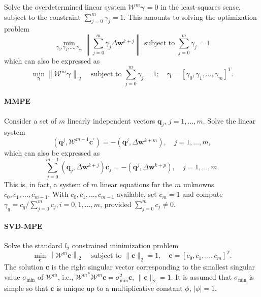 Solve the overdetermined linear system \(\mathscr W^{m} \boldsymbol\gamma=0\) in the least-squares sense, subject to the constraint \(\sum_{j=0}^{m} \gamma_{j}=1\).
This amounts to solving the optimization problem
\begin{equation}
\min _{\gamma_{0}, \gamma_{1}, \ldots, \gamma_{m}}\left\|\sum_{j=0}^{m} \gamma_{j} \Delta\mathbf w^{k+j}\right\| \text { subject to } \sum_{j=0}^{m} \gamma_{j}=1
\end{equation}
which can also be expressed as
\begin{equation}
\min _{\boldsymbol\gamma}\left\|\mathscr W^{m} \boldsymbol\gamma\right\|_2 \quad \text { subject to } \sum_{j=0}^{m} \gamma_{j}=1 ; \quad \boldsymbol\gamma=\left[\gamma_{0}, \gamma_{1}, \ldots, \gamma_{m}\right]^{T} .
\end{equation}

\paragraph{MMPE}

Consider a set of \(m\) linearly independent vectors \(\mathbf q_j\), \(j=1, \dots, m\).
Solve the linear system
\begin{equation}
  \left(\mathbf q^{j}, \mathscr W^{m-1} \mathbf c^{\prime}\right)=-\left(\mathbf q^{j}, \Delta \mathbf w^{k+m}\right), \quad j=1, \ldots, m,
\end{equation}
which can also be expressed as
\begin{equation}
  \sum_{j=0}^{m-1}\left(\mathbf q_{j}, \Delta \mathbf w^{k+j}\right) \mathbf c_{j}=-\left(\mathbf q^{j}, \Delta \mathbf w^{k+p}\right), \quad j=1, \ldots, m.
\end{equation}
This is, in fact, a system of \(m\) linear equations for the \(m\) unknowns \(c_{0}, c_{1}, \ldots, c_{m-1}\).
With \(c_{0}, c_{1}, \ldots, c_{m-1}\) available, set \(c_{m}=1\) and compute \(\gamma_{q}=c_{q} / \sum_{j=0}^{m} c_{j}, i=0,1, \ldots, m\), provided \(\sum_{j=0}^{m} c_{j} \neq 0\).

\paragraph{SVD-MPE}

Solve the standard \(l_{2}\) constrained minimization problem
\begin{equation}
  \min_{\mathbf c}\left\|\mathscr W^{m} \mathbf c\right\|_{2} \quad \text { subject to }\|\mathbf c\|_{2}=1, \quad \mathbf c=\left[c_{0}, c_{1}, \ldots, c_{m}\right]^{T} .
\end{equation}
The solution \(\mathbf c\) is the right singular vector corresponding to the smallest singular value \(\sigma_{\min }\) of \(\mathscr W^{m}\), i.e., \({\mathscr W^{m}}^{*} \mathscr W^{m} \mathbf c=\sigma_{\min }^{2} \mathbf c\), \(\|\mathbf c\|_{2}=1\).
It is assumed that \(\sigma_{\min }\) is simple so that \(\mathbf c\) is unique up to a multiplicative constant \(\phi\), \(|\phi|=1\).

